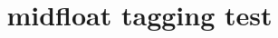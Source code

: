 \documentclass[twocolumn]{article}
\title{midfloat tagging test}
\begin{document}
\kant[1]

\begin{strip}
\kant[2-3]
\end{strip}

\kant[4-5]
\end{document}
